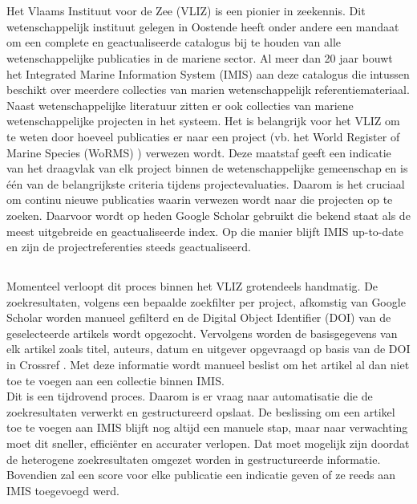 
\chapter{}%
\label{ch:inleiding}

Het Vlaams Instituut voor de Zee (VLIZ) \autocite{Vliz2024} is een pionier in zeekennis. Dit wetenschappelijk instituut gelegen in Oostende heeft onder andere een mandaat om een complete en geactualiseerde catalogus bij te houden van alle wetenschappelijke publicaties in de mariene sector. Al meer dan 20 jaar bouwt het Integrated Marine Information System (IMIS) aan deze catalogus die intussen beschikt over meerdere collecties van marien wetenschappelijk referentiemateriaal.\\
Naast wetenschappelijke literatuur zitten er ook collecties van mariene wetenschappelijke projecten in het systeem. Het is belangrijk voor het VLIZ om te weten door hoeveel publicaties er naar een project (vb. het World Register of Marine Species (WoRMS) \autocite{Worms2024}) verwezen wordt. Deze maatstaf geeft een indicatie van het draagvlak van elk project binnen de wetenschappelijke gemeenschap en is één van de belangrijkste criteria tijdens projectevaluaties. Daarom is het cruciaal om continu nieuwe publicaties waarin verwezen wordt naar die projecten op te zoeken. Daarvoor wordt op heden Google Scholar gebruikt die bekend staat als de meest uitgebreide en geactualiseerde index. Op die manier blijft IMIS up-to-date en zijn de projectreferenties steeds geactualiseerd.

\section{}%
\label{sec:probleemstelling}

Momenteel verloopt dit proces binnen het VLIZ grotendeels handmatig. De zoekresultaten, volgens een bepaalde zoekfilter per project, afkomstig van Google Scholar worden manueel gefilterd en de Digital Object Identifier (DOI) van de geselecteerde artikels wordt opgezocht.
Vervolgens worden de basisgegevens van elk artikel zoals titel, auteurs, datum en uitgever opgevraagd op basis van de DOI in Crossref \autocite{Crossref2024}. Met deze informatie wordt manueel beslist om het artikel al dan niet toe te voegen aan een collectie binnen IMIS.\\
Dit is een tijdrovend proces. Daarom is er vraag naar automatisatie die de zoekresultaten verwerkt en gestructureerd opslaat. De beslissing om een artikel toe te voegen aan IMIS blijft nog altijd een manuele stap, maar naar verwachting moet dit sneller, efficiënter en accurater verlopen. Dat moet mogelijk zijn doordat de heterogene zoekresultaten omgezet worden in gestructureerde informatie. Bovendien zal een score voor elke publicatie een indicatie geven of ze reeds aan IMIS toegevoegd werd. 

